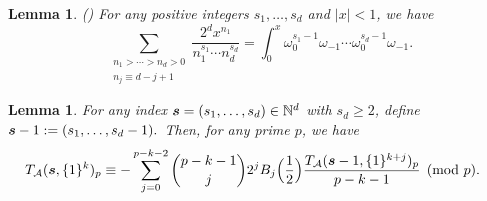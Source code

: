 \documentclass{article}
\newcommand\om{{\omega}}
\newcommand{\bfs}{{\boldsymbol{\sl{s}}}}
\newcommand{\calA}{\mathcal{A}}
\newcommand{\N}{\mathbb{N}}
\theoremstyle{plain}
\newtheorem{lem}[thm]{Lemma}
\theoremstyle{definition}
\begin{document}
\begin{lem}\label{lem:T(x)_integral} \emph{(\cite[Line 8]{Zhao2023Dec})}
For any positive integers $s_1,\dots,s_d$ and $|x|<1$, we have
\begin{equation*}
\sum_{\substack{n_1>\cdots>n_d>0\\n_j\equiv d-j+1}}\frac{2^dx^{n_1}}{n_1^{s_1}\cdots n_d^{s_d}}
=\int_0^{x}\om_0^{s_1-1}\om_{-1}\cdots \om_0^{s_d-1}\om_{-1}.
\end{equation*}
\end{lem}

\begin{lem}\label{lem:F(x)}
For any index $\bfs=(s_1,\dots,s_d)\in\N^d$ with $s_d\ge 2$, define $\bfs-1:=(s_1,\dots,s_d-1).$
Then, for any prime $p$, we have
\begin{align}\label{equ:keyReduction}
T_\calA(\bfs,\{1\}^k)_p &\equiv -\sum_{j=0}^{p-k-2} \binom{p-k-1}{j}  2^jB_j\Big(\frac12\Big) \frac{T_\calA(\bfs-1,\{1\}^{k+j})_p }{p-k-1}  \pmod{p}.
\end{align}
\end{lem}
\end{document}
